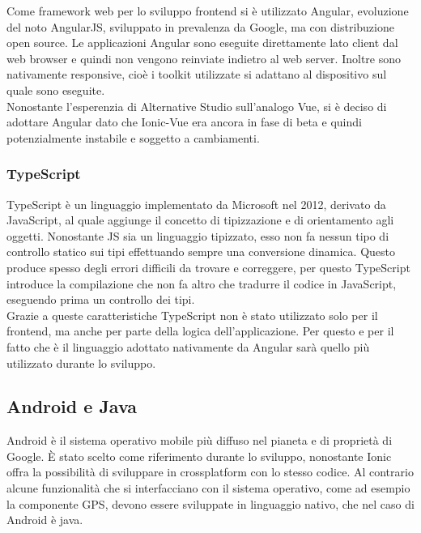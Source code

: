Come framework web per lo sviluppo \gls{frontend} si è utilizzato Angular, evoluzione del noto AngularJS, sviluppato in prevalenza da Google, ma con distribuzione \gls{open source}. Le applicazioni Angular sono eseguite direttamente lato client dal web browser e quindi non vengono reinviate indietro al web server. Inoltre sono nativamente responsive, cioè i toolkit utilizzate si adattano al dispositivo sul quale sono eseguite. \\
Nonostante l'esperenzia di Alternative Studio sull'analogo Vue, si è deciso di adottare Angular dato che Ionic-Vue era ancora in fase di
beta e quindi potenzialmente instabile e soggetto a cambiamenti.

\subsubsection{TypeScript}

TypeScript è un linguaggio implementato da Microsoft nel 2012, derivato da JavaScript, al quale aggiunge il concetto di tipizzazione e di orientamento agli oggetti. Nonostante JS sia un linguaggio \gls{tipizzato}, esso non fa nessun tipo di controllo statico sui tipi effettuando sempre una conversione dinamica. Questo produce spesso degli errori difficili da trovare e correggere, per questo TypeScript introduce la compilazione che non fa altro che tradurre il codice in JavaScript, eseguendo prima un controllo dei tipi.\\
Grazie a queste caratteristiche TypeScript non è stato utilizzato solo per il \gls{frontend}, ma anche per parte della logica
dell'applicazione. Per questo e per il fatto che è il linguaggio adottato nativamente da Angular sarà quello più utilizzato durante lo
sviluppo.

\subsection{Android e Java}

\gls{Android} è il sistema operativo mobile più diffuso nel pianeta e di proprietà di \gls{Google}. È stato scelto come riferimento durante
lo sviluppo, nonostante Ionic offra la possibilità di sviluppare in crossplatform con lo stesso codice. Al contrario alcune
funzionalità che si interfacciano con il sistema operativo, come ad esempio la componente GPS, devono essere sviluppate in linguaggio
nativo, che nel caso di \gls{Android} è \gls{java}.


